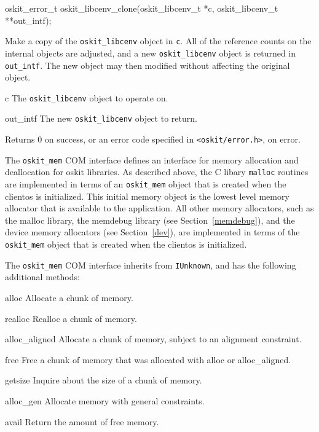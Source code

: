 \begin{apisyn}

	\funcproto oskit_error_t
		   oskit_libcenv_clone(oskit_libcenv_t *c,
				oskit_libcenv_t **out_intf);
\end{apisyn}
\begin{apidesc}
	Make a copy of the \texttt{oskit_libcenv} object in \texttt{c}. All
	of the reference counts on the internal objects are adjusted, and a
	new \texttt{oskit_libcenv} object is returned in \texttt{out_intf}. 
	The new object may then modified without affecting the original
	object. 
\end{apidesc}
\begin{apiparm}
	\item[c]
		The \texttt{oskit_libcenv} object to operate on.
	\item[out_intf]
		The new \texttt{oskit_libcenv} object to return.
\end{apiparm}
\begin{apiret}
	Returns 0 on success, or an error code specified in
	{\tt <oskit/error.h>}, on error.
\end{apiret}


\label{oskit-mem}

The \texttt{oskit_mem} COM interface defines an interface for memory
allocation and deallocation for oskit libraries. As described above, the C
libary \texttt{malloc} routines are implemented in terms of an
\texttt{oskit_mem} object that is created when the clientos is initialized.
This initial memory object is the lowest level memory allocator that is
available to the application. All other memory allocators, such as the
malloc library, the memdebug library (see Section~\ref{memdebug}), and the
device memory allocators (see Section~\ref{dev}), are implemented in terms
of the \texttt{oskit_mem} object that is created when the clientos is
initialized. 

The {\tt oskit_mem} COM interface inherits from {\tt IUnknown}, and has the
following additional methods:
\begin{icsymlist}
\item[alloc]
	Allocate a chunk of memory.
\item[realloc]
	Realloc a chunk of memory.
\item[alloc_aligned]
	Allocate a chunk of memory, subject to an alignment constraint.
\item[free]
	Free a chunk of memory that was allocated with alloc or
	alloc_aligned.
\item[getsize]
	Inquire about the size of a chunk of memory.
\item[alloc_gen]
	Allocate memory with general constraints.
\item[avail]
	Return the amount of free memory.
\end{icsymlist}

